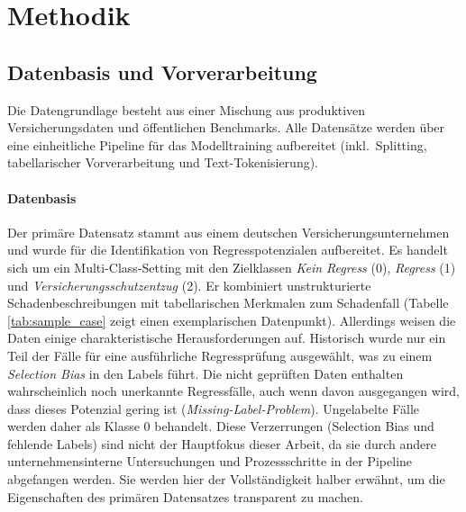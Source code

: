 \section{Methodik}
\label{sec:methodik}

\subsection{Datenbasis und Vorverarbeitung}
\label{sec:data_basis}

Die Datengrundlage besteht aus einer Mischung aus produktiven Versicherungsdaten und öffentlichen Benchmarks. Alle Datensätze werden über eine einheitliche Pipeline für das Modelltraining aufbereitet (inkl.\ Splitting, tabellarischer Vorverarbeitung und Text-Tokenisierung).

\paragraph{Datenbasis}
Der primäre Datensatz stammt aus einem deutschen Versicherungsunternehmen und wurde für die Identifikation von Regresspotenzialen aufbereitet. Es handelt sich um ein Multi-Class-Setting mit den Zielklassen \textit{Kein Regress} (0), \textit{Regress} (1) und \textit{Versicherungsschutzentzug} (2). Er kombiniert unstrukturierte Schadenbeschreibungen mit tabellarischen Merkmalen zum Schadenfall (Tabelle \ref{tab:sample_case} zeigt einen exemplarischen Datenpunkt). Allerdings weisen die Daten einige charakteristische Herausforderungen auf. Historisch wurde nur ein Teil der Fälle für eine ausführliche Regressprüfung ausgewählt, was zu einem \textit{Selection Bias} in den Labels führt. Die nicht geprüften Daten enthalten wahrscheinlich noch unerkannte Regressfälle, auch wenn davon ausgegangen wird, dass dieses Potenzial gering ist (\textit{Missing-Label-Problem}). Ungelabelte Fälle werden daher als Klasse 0 behandelt. Diese Verzerrungen (Selection Bias und fehlende Labels) sind nicht der Hauptfokus dieser Arbeit, da sie durch andere unternehmensinterne Untersuchungen und Prozessschritte in der Pipeline abgefangen werden. Sie werden hier der Vollständigkeit halber erwähnt, um die Eigenschaften des primären Datensatzes transparent zu machen.


